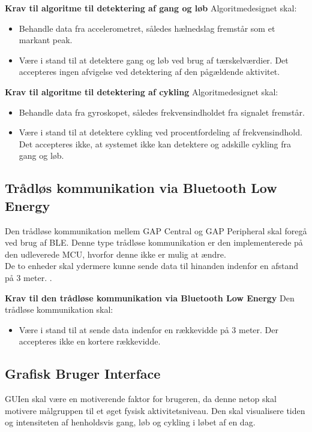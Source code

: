 \textbf{Krav til algoritme til detektering af gang og løb} \newline 
Algoritmedesignet skal:
\begin{itemize}
	\item Behandle data fra accelerometret, således hælnedslag fremstår som et markant peak.
	\item Være i stand til at detektere gang og løb ved brug af tærskelværdier. Det accepteres ingen afvigelse ved detektering af den pågældende aktivitet.
\end{itemize}

\textbf{Krav til algoritme til detektering af cykling} \newline 
Algoritmedesignet skal:
\begin{itemize}
	\item Behandle data fra gyroskopet, således frekvensindholdet fra signalet fremstår.
	\item Være i stand til at detektere cykling ved procentfordeling af frekvensindhold. Det accepteres ikke, at systemet ikke kan detektere og adskille cykling fra gang og løb.
\end{itemize}

\subsection{Trådløs kommunikation via Bluetooth Low Energy}\label{krav_BLE}
Den trådløse kommunikation mellem GAP Central og GAP Peripheral skal foregå ved brug af BLE. Denne type trådløse kommunikation er den implementerede på den udleverede MCU, hvorfor denne ikke er mulig at ændre.\\
De to enheder skal ydermere kunne sende data til hinanden indenfor en afstand på 3 meter. . 

\textbf{Krav til den trådløse kommunikation via Bluetooth Low Energy} \newline 
Den trådløse kommunikation skal:
\begin{itemize}
	\item Være i stand til at sende data indenfor en rækkevidde på 3 meter. Der accepteres ikke en kortere rækkevidde.
\end{itemize}

\subsection{Grafisk Bruger Interface}\label{krav_GUI}
GUIen skal være en motiverende faktor for brugeren, da denne netop skal motivere målgruppen til et øget fysisk aktivitetsniveau. Den skal visualisere tiden og intensiteten af henholdsvis gang, løb og cykling i løbet af en dag. %

